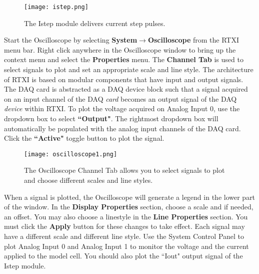 \begin{figure}[h]
\begin{center}
\texttt{[image: istep.png]} 
\caption[Istep]{The Istep module delivers current step pulses.} 
\end{center}
\label{fig:istep}
\end{figure}

\vspace{1cm}
Start the Oscilloscope by selecting \textbf{System}$\rightarrow$\textbf{Oscilloscope} from the RTXI menu bar. Right click anywhere in the Oscilloscope window to bring up the context menu and select the \textbf{Properties} menu. The \textbf{Channel Tab} is used to select signals to plot and set an appropriate scale and line style. The architecture of RTXI is based on modular components that have input and output signals. \attention The DAQ card is abstracted as a DAQ device block such that a signal acquired on an input channel of the DAQ \emph{card} becomes an output signal of the DAQ \emph{device} within RTXI. To plot the voltage acquired on Analog Input 0, use the dropdown box to select \textbf{``Output"}. The rightmost dropdown box will automatically be populated with the analog input channels of the DAQ card. Click the \textbf{``Active"} toggle button to plot the signal. 

\begin{figure}[h]
\begin{center}
\texttt{[image: oscilloscope1.png]} 
\caption[Oscilloscope]{The Oscilloscope Channel Tab allows you to select signals to plot and choose different scales and line styles.} 
\end{center}
\end{figure}

When a signal is plotted, the Oscilloscope will generate a legend in the lower part of the window. In the \textbf{Display Properties} section, choose a scale and if needed, an offset. You may also choose a linestyle in the \textbf{Line Properties} section. You must click the \textbf{Apply} button for these changes to take effect. Each signal may have a different scale and different line style. Use the System Control Panel to plot Analog Input 0 and Analog Input 1 to monitor the voltage and the current applied to the model cell. You should also plot the ``Iout" output signal of the Istep module.

